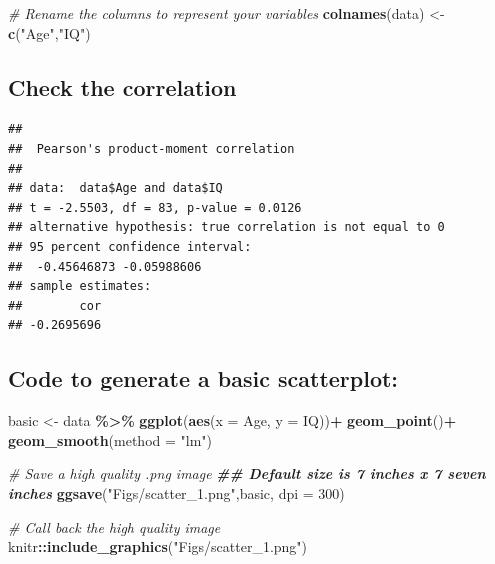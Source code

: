 \documentclass[
]{book}
\newenvironment{Shaded}{\begin{snugshade}}{\end{snugshade}}
\newcommand{\AttributeTok}[1]{\textcolor[rgb]{0.13,0.29,0.53}{#1}}
\newcommand{\CommentTok}[1]{\textcolor[rgb]{0.56,0.35,0.01}{\textit{#1}}}
\newcommand{\DecValTok}[1]{\textcolor[rgb]{0.00,0.00,0.81}{#1}}
\newcommand{\DocumentationTok}[1]{\textcolor[rgb]{0.56,0.35,0.01}{\textbf{\textit{#1}}}}
\newcommand{\FunctionTok}[1]{\textcolor[rgb]{0.13,0.29,0.53}{\textbf{#1}}}
\newcommand{\NormalTok}[1]{#1}
\newcommand{\OtherTok}[1]{\textcolor[rgb]{0.56,0.35,0.01}{#1}}
\newcommand{\SpecialCharTok}[1]{\textcolor[rgb]{0.81,0.36,0.00}{\textbf{#1}}}
\newcommand{\StringTok}[1]{\textcolor[rgb]{0.31,0.60,0.02}{#1}}
\begin{document}
\begin{Shaded}
\begin{Highlighting}[]
\CommentTok{\# Rename the columns to represent your variables }
\FunctionTok{colnames}\NormalTok{(data) }\OtherTok{\textless{}{-}} \FunctionTok{c}\NormalTok{(}\StringTok{"Age"}\NormalTok{,}\StringTok{"IQ"}\NormalTok{)}
\end{Highlighting}
\end{Shaded}

\subsection*{Check the correlation}\label{check-the-correlation}

\begin{Shaded}
\end{Shaded}

\begin{verbatim}
## 
##  Pearson's product-moment correlation
## 
## data:  data$Age and data$IQ
## t = -2.5503, df = 83, p-value = 0.0126
## alternative hypothesis: true correlation is not equal to 0
## 95 percent confidence interval:
##  -0.45646873 -0.05988606
## sample estimates:
##        cor 
## -0.2695696
\end{verbatim}

\subsection*{Code to generate a basic scatterplot:}\label{code-to-generate-a-basic-scatterplot}

\begin{Shaded}
\begin{Highlighting}[]
\NormalTok{basic }\OtherTok{\textless{}{-}}\NormalTok{ data }\SpecialCharTok{\%\textgreater{}\%}
  \FunctionTok{ggplot}\NormalTok{(}\FunctionTok{aes}\NormalTok{(}\AttributeTok{x =}\NormalTok{ Age, }\AttributeTok{y =}\NormalTok{ IQ))}\SpecialCharTok{+}
  \FunctionTok{geom\_point}\NormalTok{()}\SpecialCharTok{+}
  \FunctionTok{geom\_smooth}\NormalTok{(}\AttributeTok{method =} \StringTok{"lm"}\NormalTok{)}

\CommentTok{\# Save a high quality .png image}
\DocumentationTok{\#\# Default size is 7 inches x 7 seven inches}
\FunctionTok{ggsave}\NormalTok{(}\StringTok{"Figs/scatter\_1.png"}\NormalTok{,basic, }\AttributeTok{dpi =} \DecValTok{300}\NormalTok{)}

\CommentTok{\# Call back the high quality image }
\NormalTok{knitr}\SpecialCharTok{::}\FunctionTok{include\_graphics}\NormalTok{(}\StringTok{"Figs/scatter\_1.png"}\NormalTok{)}
\end{Highlighting}
\end{Shaded}
\end{document}
